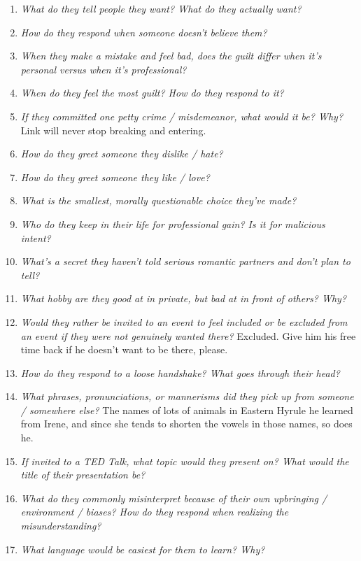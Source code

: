 \begin{enumerate}
    \item\textit{What do they tell people they want? What do they actually want?}
    \item\textit{How do they respond when someone doesn’t believe them?}
    \item\textit{When they make a mistake and feel bad, does the guilt differ when it’s personal versus when it’s professional?}
    \item\textit{When do they feel the most guilt? How do they respond to it?}
    \item\textit{If they committed one petty crime / misdemeanor, what would it be? Why?}
        Link will never stop breaking and entering.
    \item\textit{How do they greet someone they dislike / hate?}
    \item\textit{How do they greet someone they like / love?}
    \item\textit{What is the smallest, morally questionable choice they’ve made?}
    \item\textit{Who do they keep in their life for professional gain? Is it for malicious intent?}
    \item\textit{What’s a secret they haven’t told serious romantic partners and don’t plan to tell?} 
    \item\textit{What hobby are they good at in private, but bad at in front of others? Why?}
    \item\textit{Would they rather be invited to an event to feel included or be excluded from an event if they were not genuinely wanted there?}
        Excluded. Give him his free time back if he doesn't want to be there, please.
    \item\textit{How do they respond to a loose handshake? What goes through their head?}
    \item\textit{What phrases, pronunciations, or mannerisms did they pick up from someone / somewhere else?}
        The names of lots of animals in Eastern Hyrule he learned from Irene, and since she tends to shorten the vowels in those names, so does he. 
    \item\textit{If invited to a TED Talk, what topic would they present on? What would the title of their presentation be?}
    \item\textit{What do they commonly misinterpret because of their own upbringing / environment / biases? How do they respond when realizing the misunderstanding?}
    \item\textit{What language would be easiest for them to learn? Why?}

\end{enumerate}
